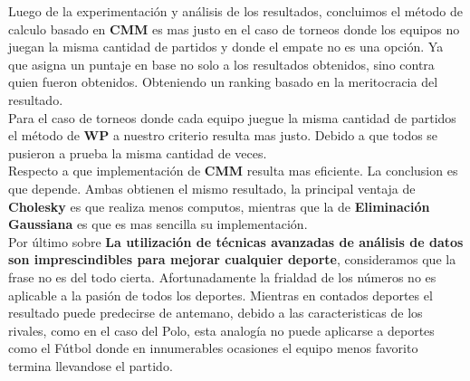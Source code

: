Luego de la experimentación y análisis de los resultados, concluimos el método de calculo basado en \textbf{CMM} es mas justo en el 
caso de torneos donde los equipos no juegan la misma cantidad de partidos y donde el empate no es una opción. Ya que asigna un puntaje 
en base no solo a los resultados obtenidos, sino contra quien fueron obtenidos. Obteniendo un ranking basado en la meritocracia del resultado. \\

Para el caso de torneos donde cada equipo juegue la misma cantidad de partidos el método de \textbf{WP} a nuestro criterio resulta mas justo. 
Debido a que todos se pusieron a prueba la misma cantidad de veces. \\

Respecto a que implementación de \textbf{CMM} resulta mas eficiente. La conclusion es que depende. Ambas obtienen el mismo resultado, 
la principal ventaja de \textbf{Cholesky} es que realiza menos computos, mientras que la de \textbf{Eliminación Gaussiana} es que es mas 
sencilla su implementación. \\

Por último sobre \textbf{La utilización de técnicas avanzadas de análisis de datos son imprescindibles para mejorar cualquier deporte}, 
consideramos que la frase no es del todo cierta. Afortunadamente la frialdad de los números no es aplicable a la pasión de todos los deportes. 
Mientras en contados deportes el resultado puede predecirse de antemano, debido a las caracteristicas de los rivales, como en el caso del Polo, 
esta analogía no puede aplicarse a deportes como el Fútbol donde en innumerables ocasiones el equipo menos favorito termina llevandose el partido.
